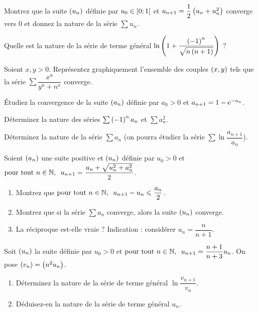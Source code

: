 \begin{exo}
Montrez que la suite \(\left(u_n\right)\) définie par \(u_0\in\left[0;1\right[\) et \(u_{n+1}=\dfrac{1}{2}\left(u_n+u_n^2\right)\) converge vers \(0\) et donnez la nature de la série \(\sum u_n\).
\end{exo}



\begin{exo}
Quelle est la nature de la série de terme général \(\ln\left(1+\dfrac{\left(-1\right)^n}{\sqrt{n\left(n+1\right)}}\right)\) ?
\end{exo}



\begin{exo}
Soient \(x,y>0\). Représentez graphiquement l'ensemble des couples \(\left(x,y\right)\) tels que la série \(\sum\dfrac{x^n}{y^n+n^x}\) converge.
\end{exo}



\begin{exo}
Étudiez la convergence de la suite \(\left(a_n\right)\) définie par \(a_0>0\) et \(a_{n+1}=1-\mathrm{e}^{-a_n}\).

Déterminez la nature des séries \(\sum\left(-1\right)^na_n\) et \(\sum a_n^2\).

Déterminez la nature de la série \(\sum a_n\) (on pourra étudier la série \(\sum\ln\dfrac{a_{n+1}}{a_n}\)).
\end{exo}



\begin{exo}
Soient \(\left(a_n\right)\) une suite positive et \(\left(u_n\right)\) définie par \(u_0>0\) et \(\quantifs{\tpt n\in\N}u_{n+1}=\dfrac{u_n+\sqrt{u_n^2+a_n^2}}{2}\).

\begin{enumerate}
    \item Montrez que \(\quantifs{\tpt n\in\N}u_{n+1}-u_n\leq\dfrac{a_n}{2}\). \\
    \item Montrez que si la série \(\sum a_n\) converge, alors la suite \(\left(u_n\right)\) converge. \\
    \item La réciproque est-elle vraie ? Indication : considérer \(u_n=\dfrac{n}{n+1}\).
\end{enumerate}
\end{exo}



\begin{exo}
Soit \(\left(u_n\right)\) la suite définie par \(u_0>0\) et \(\quantifs{\tpt n\in\N}u_{n+1}=\dfrac{n+1}{n+3}u_n\). On pose \(\left(v_n\right)=\left(n^2u_n\right)\).

\begin{enumerate}
    \item Déterminez la nature de la série de terme général \(\ln\dfrac{v_{n+1}}{v_n}\). \\
    \item Déduisez-en la nature de la série de terme général \(u_n\).
\end{enumerate}
\end{exo}



